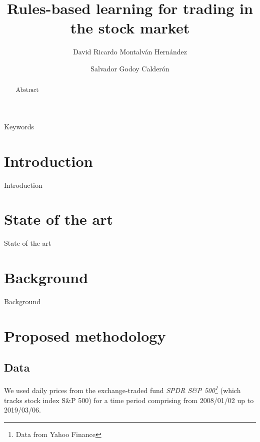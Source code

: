 \documentclass[preprint,3p,twocolumn]{elsarticle}
\begin{document}
\begin{frontmatter}
  \title{Rules-based learning for trading in the stock market}
  
  \author[1]{David Ricardo Montalván Hernández }
  
  \author[1]{Salvador Godoy Calderón}
  
  \address[1]{Centro de Investigación en Computación, Instituto Politécnico Nacional,
  Av. Juan de Dios Bátiz e/ M.O. de Mendizábal s/n, Nva Ind. Vallejo, 07738, Mexico City, Mexico}
  
  
  \begin{abstract}
  Abstract
  \end{abstract}
  
  \begin{keyword}
  Keywords
  \end{keyword}
  
\end{frontmatter}

\section{Introduction}
\label{sec:introduction}
Introduction

\section{State of the art}
\label{sec:state of the art}
State of the art

\section{Background}
\label{sec:background}
Background

\section{Proposed methodology}
\label{sec:proposed methodology}
\subsection{Data}
\label{subsec:data}
We used daily prices from the exchange-traded fund \textit{SPDR S\&P 500\footnote{Data from Yahoo Finance}} (which tracks stock index S\&P 500) for a time period comprising from 2008/01/02 up to 2019/03/06.
\end{document}
